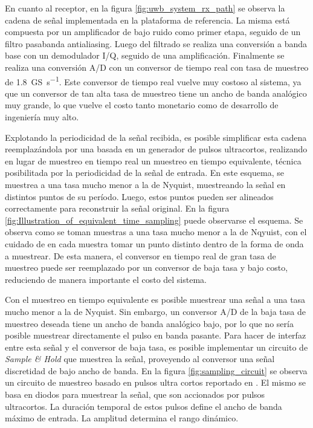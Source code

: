 En cuanto al receptor, en la figura \ref{fig:uwb_system_rx_path} se observa la
cadena de señal implementada en la plataforma de referencia. La misma está
compuesta por un amplificador de bajo ruido como primer etapa, seguido de un
filtro pasabanda antialiasing. Luego del filtrado se realiza una conversión a
banda base con un demodulador I/Q, seguido de una amplificación. Finalmente se
realiza una conversión A/D con un conversor de tiempo real con tasa de muestreo
de \qty[per-mode=symbol]{1.8}{\giga\siemens\per\second}. Este conversor de tiempo
real vuelve muy costoso al sistema, ya que un conversor de tan alta tasa de
muestreo tiene un ancho de banda analógico muy grande, lo que vuelve el costo
tanto monetario como de desarrollo de ingeniería muy alto.

Explotando la periodicidad de la señal recibida, es posible simplificar esta
cadena reemplazándola por una basada en un generador de pulsos ultracortos,
realizando en lugar de muestreo en tiempo real un muestreo en tiempo
equivalente, técnica posibilitada por la periodicidad de la señal de entrada. En
este esquema, se muestrea a una tasa mucho menor a la de Nyquist, muestreando la
señal en distintos puntos de su período. Luego, estos puntos pueden ser
alineados correctamente para reconstruir la señal original. En la figura
\ref{fig:Illustration_of_equivalent_time_sampling} puede observarse el esquema.
Se observa como se toman muestras a una tasa mucho menor a la de Nqyuist, con el
cuidado de en cada muestra tomar un punto distinto dentro de la forma de onda a
muestrear. De esta manera, el conversor en tiempo real de gran tasa de muestreo
puede ser reemplazado por un conversor de baja tasa y bajo costo, reduciendo de
manera importante el costo del sistema.

Con el muestreo en tiempo equivalente es posible muestrear una señal a una tasa
mucho menor a la de Nyquist. Sin embargo, un conversor A/D de la baja tasa de
muestreo deseada tiene un ancho de banda analógico bajo, por lo que no sería
posible muestrear directamente el pulso en banda pasante. Para hacer de interfaz
entre esta señal y el conversor de baja tasa, es posible implementar un circuito
de \textit{Sample \& Hold} que muestrea la señal, proveyendo al conversor una
señal discretidad de bajo ancho de banda. En la figura
\ref{fig:sampling_circuit} se observa un circuito de muestreo basado en pulsos
ultra cortos reportado en \cite{han2004}. El mismo se basa en diodos para
muestrear la señal, que son accionados por pulsos ultracortos. La duración
temporal de estos pulsos define el ancho de banda máximo de entrada. La amplitud
determina el rango dinámico.

